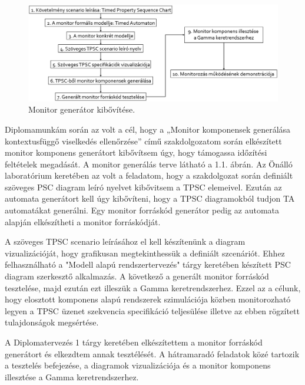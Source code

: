 \chapter{\bevezetes}

\begin{figure}[!ht]
    \centering
    \includegraphics[width=150mm, keepaspectratio]{figures/generation_plan.png}
    \caption{Monitor generátor kibővítése.}
\end{figure}

Diplomamunkám során az volt a cél, hogy a „Monitor komponensek generálása kontextusfüggő viselkedés ellenőrzése” című szakdolgozatom során elkészített monitor komponens generátort kibővítsem úgy, hogy támogassa időzítési feltételek megadását.
A monitor generálás terve látható a 1.1. ábrán.
Az Önálló laboratórium keretében az volt a feladatom, hogy a szakdolgozat során definiált szöveges PSC diagram leíró nyelvet kibővitsem a TPSC elemeivel.
Ezután az automata generátort kell úgy kibővíteni, hogy a TPSC diagramokból tudjon TA automatákat generálni.
Egy monitor forráskód generátor pedig az automata alapján elkészítheti a monitor forráskódját.

A szöveges TPSC scenario leírásához el kell készítenünk a diagram vizualizációját, hogy grafikusan megtekinthessük a definiált szcenáriót.
Ehhez felhasználható a "Modell alapú rendszertervezés" tárgy keretében készített PSC diagram szerkesztő alkalmazás.
A következő a generált monitor forráskód tesztelése, majd ezután ezt illeszük a Gamma keretrendszerhez.
Ezzel az a célunk, hogy elosztott komponens alapú rendszerek szimulációja közben monitorozható legyen a TPSC üzenet szekvencia specifikáció teljesülése illetve az ebben rögzített tulajdonságok megsértése.

A Diplomatervezés 1 tárgy keretében elkészítettem a monitor forráskód generátort és elkezdtem annak tesztélését.
A hátramaradó feladatok közé tartozik a tesztelés befejezése, a diagramok vizualizációja és a monitor komponens illesztése a Gamma keretrendszerhez.

